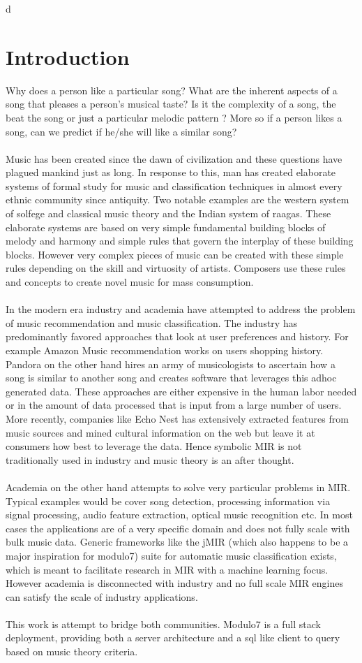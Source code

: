 d\chapter{Introduction}
\label{sec:intro}

Why does a person like a particular song? What are the inherent aspects of a song that pleases a person's musical taste? Is it the complexity of a song, the beat the song or just a particular melodic pattern ? More so if a person likes a song, can we predict if he/she will like a similar song? \\\\
Music has been created since the dawn of civilization and these questions have plagued mankind just as long. In response to this, man has created elaborate systems of formal study for music and classification techniques in almost every ethnic community since antiquity. Two notable examples are the western system of solfege and classical music theory and the Indian system of raagas. These elaborate systems are based on very simple fundamental building blocks of melody and harmony and simple rules that govern the interplay of these building blocks. However very complex pieces of music can be created with these simple rules depending on the skill and virtuosity of artists. Composers use these rules and concepts to create novel music for mass consumption. \\\\
In the modern era industry and academia have attempted to address the problem of music recommendation and music classification. The industry has predominantly favored approaches that look at user preferences and history. For example Amazon Music recommendation works on users shopping history. Pandora on the other hand hires an army of musicologists to ascertain how a song is similar to another song and creates software that leverages this adhoc generated data. These approaches are either expensive in the human labor needed or in the amount of data processed that is input from a large number of users. More recently, companies like Echo Nest has extensively extracted features from music sources and mined cultural information on the web but leave it at consumers how best to leverage the data. Hence symbolic MIR is not traditionally used in industry and music theory is an after thought. \\\\
Academia on the other hand attempts to solve very particular problems in MIR. Typical examples would be cover song detection, processing information via signal processing, audio feature extraction, optical music recognition etc. In most cases the applications are of a very specific domain and does not fully scale with bulk music data. Generic frameworks like the jMIR (which also happens to be a major inspiration for modulo7) suite for automatic music classification exists, which is meant to facilitate research in MIR with a machine learning focus. However academia is disconnected with industry and no full scale MIR engines can satisfy the scale of industry applications. \\\\
This work is attempt to bridge both communities. Modulo7 is a full stack deployment, providing both a server architecture and a sql like client to query based on music theory criteria.
